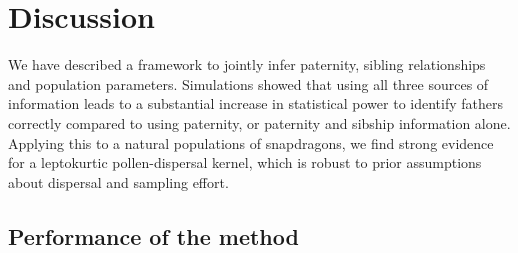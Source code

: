 \documentclass[10pt, a4paper, twocolumn]{article} %
\begin{document}

\section{Discussion}

We have described a framework to jointly infer paternity, sibling relationships and population parameters. Simulations showed that using all three sources of information leads to a substantial increase in statistical power to identify fathers correctly compared to using paternity, or paternity and sibship information alone. Applying this to a natural populations of snapdragons, we find strong evidence for a leptokurtic pollen-dispersal kernel, which is robust to prior assumptions about dispersal and sampling effort.

\subsection{Performance of the method}
\end{document}
